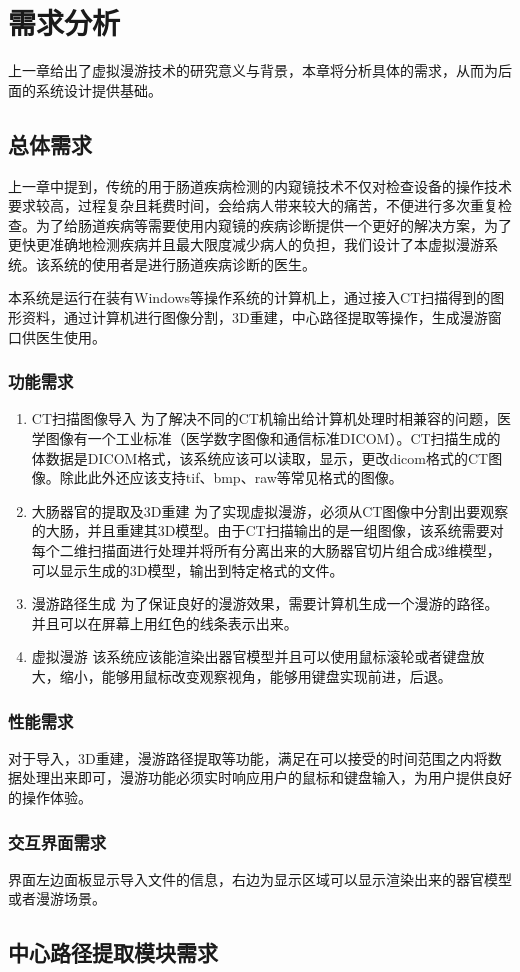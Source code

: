 \chapter{需求分析}
上一章给出了虚拟漫游技术的研究意义与背景，本章将分析具体的需求，从而为后面的系统设计提供基础。

\section{总体需求}
上一章中提到，传统的用于肠道疾病检测的内窥镜技术不仅对检查设备的操作技术要求较高，过程复杂且耗费时间，会给病人带来较大的痛苦，不便进行多次重复检查。为了给肠道疾病等需要使用内窥镜的疾病诊断提供一个更好的解决方案，为了更快更准确地检测疾病并且最大限度减少病人的负担，我们设计了本虚拟漫游系统。该系统的使用者是进行肠道疾病诊断的医生。

本系统是运行在装有Windows等操作系统的计算机上，通过接入CT扫描得到的图形资料，通过计算机进行图像分割，3D重建，中心路径提取等操作，生成漫游窗口供医生使用。
\subsection{功能需求}

\begin{enumerate}
    \item CT扫描图像导入
为了解决不同的CT机输出给计算机处理时相兼容的问题，医学图像有一个工业标准（医学数字图像和通信标准DICOM）。CT扫描生成的体数据是DICOM格式，该系统应该可以读取，显示，更改dicom格式的CT图像。除此此外还应该支持tif、bmp、raw等常见格式的图像。
    \item 大肠器官的提取及3D重建
为了实现虚拟漫游，必须从CT图像中分割出要观察的大肠，并且重建其3D模型。由于CT扫描输出的是一组图像，该系统需要对每个二维扫描面进行处理并将所有分离出来的大肠器官切片组合成3维模型，可以显示生成的3D模型，输出到特定格式的文件。
    \item 漫游路径生成
为了保证良好的漫游效果，需要计算机生成一个漫游的路径。并且可以在屏幕上用红色的线条表示出来。
    \item 虚拟漫游
该系统应该能渲染出器官模型并且可以使用鼠标滚轮或者键盘放大，缩小，能够用鼠标改变观察视角，能够用键盘实现前进，后退。
\end{enumerate}

\subsection{性能需求}
对于导入，3D重建，漫游路径提取等功能，满足在可以接受的时间范围之内将数据处理出来即可，漫游功能必须实时响应用户的鼠标和键盘输入，为用户提供良好的操作体验。

\subsection{交互界面需求}
界面左边面板显示导入文件的信息，右边为显示区域可以显示渲染出来的器官模型或者漫游场景。

\section{中心路径提取模块需求}
